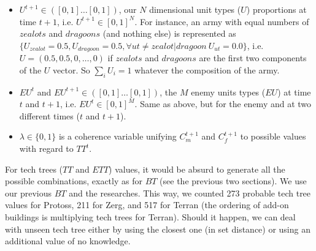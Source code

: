 \begin{itemize}
    \item $U^{t+1} \in ([0,1]\dots[0,1])$, our $N$ dimensional unit types ($U$) proportions at time $t+1$, i.e. $U^{t+1} \in [0,1]^N$. For instance, an army with equal numbers of $zealots$ and $dragoons$ (and nothing else) is represented as $\{U_{zealot}=0.5, U_{dragoon}=0.5, \forall ut \neq zealot|dragoon\ U_{ut}=0.0\}$, i.e. $U=(0.5,0.5,0,\dots,0)$ if $zealots$ and $dragoons$ are the first two components of the $U$ vector. So $\sum_i U_i = 1$ whatever the composition of the army.

    \item $EU^t$ and $EU^{t+1} \in ([0,1]\dots [0,1])$, the $M$ enemy units types ($EU$) at time $t$ and $t+1$, i.e. $EU^t \in [0,1]^M$. Same as above, but for the enemy and at two different times ($t$ and $t+1$).

    \item $\lambda \in \{0, 1\}$ is a coherence variable unifying $C_{m}^{t+1}$ and $C_{f}^{t+1}$ to possible values with regard to $TT^t$.

\end{itemize}

For tech trees ($TT$ and $ETT$) values, it would be absurd to generate all the possible combinations, exactly as for $BT$ (see the previous two sections). We use our previous $BT$ and the researches. %
This way, we counted 273 probable tech tree values for Protoss, 211 for Zerg, and 517 for Terran (the ordering of add-on buildings is multiplying tech trees for Terran). Should it happen, we can deal with unseen tech tree either by using the closest one (in set distance) or using an additional value of no knowledge. %

